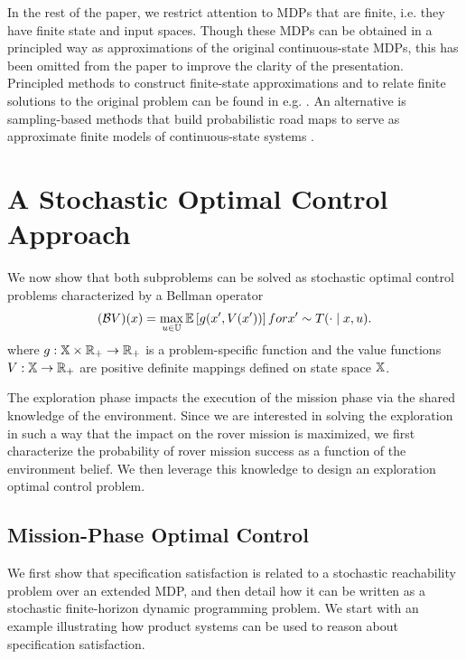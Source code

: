 \documentclass[conference]{IEEEtran}
\renewcommand{\cite}[1]{\citep{#1}}
\begin{document}
In the rest of the paper, we restrict attention to MDPs that are finite, i.e. they have finite state and input spaces. Though these MDPs can be obtained in a principled way as approximations of the original continuous-state MDPs, this has been omitted from the paper to improve the clarity of the presentation. Principled methods to construct finite-state approximations and to relate finite solutions to the original problem can be found in e.g. \cite{Zamani2015,Haesaert2017}. An alternative is sampling-based methods that build probabilistic road maps to serve as approximate finite models of continuous-state systems \cite{Kavraki1996, Agha-mohammadi2014}. 


\section{A Stochastic Optimal Control Approach}
\label{sec:stochopt}

We now show that both subproblems can be solved as stochastic optimal control problems characterized by a Bellman operator 
\begin{equation}
  (\mathcal{B} V) (x) =  \max_{u \in \mathbb{U}}\mathbb E \left[ g(x', V(x')) \right]  \relax{ for } x'\sim  T(\cdot \mid x, u).
\end{equation}
where $g:\mathbb{X} \times \mathbb{R}_+ \rightarrow \mathbb{R}_+$ is a problem-specific function and the value functions $V:\mathbb{X}\rightarrow \mathbb{R}_+$ are positive definite mappings defined on state space $\mathbb{X}$. 

The exploration phase impacts the execution of the mission phase via the shared knowledge of the environment. Since we are interested in solving the exploration in such a way that the impact on the rover mission is maximized, we first characterize the probability of rover mission success as a function of the environment belief. We then leverage this knowledge to design an exploration optimal control problem.  


\subsection{Mission-Phase Optimal Control}
We first show that specification satisfaction is related to a stochastic reachability problem over an extended MDP, and then detail how it can be written as a stochastic finite-horizon dynamic programming problem. We start with an example illustrating how product systems can be used to reason about specification satisfaction. 
\end{document}
